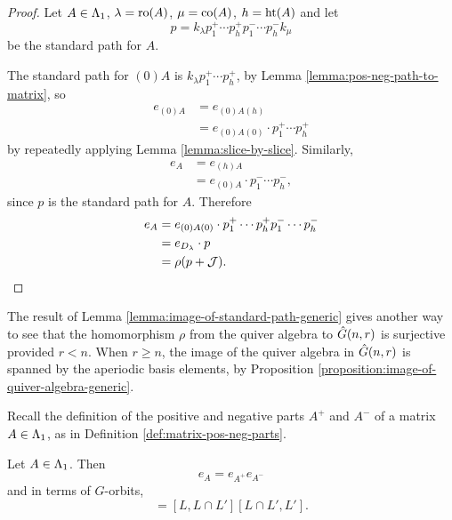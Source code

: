 \documentclass[a4paper, 11pt, twoside]{report}
\begin{document}
\begin{proof}
Let $A\in\Lambda_1{}$, $\lambda=\operatorname{ro}(A)$, $\mu=\operatorname{co}(A)$, $h=\operatorname{ht}(A)$ and let
\begin{equation*}
p=k_\lambda p_1^+\cdots p_h^+ p_1^-\cdots p_h^- k_\mu
\end{equation*}
be the standard path for $A$.

The standard path for $(0)A$ is $k_\lambda p_1^+\cdots p_h^+$, by Lemma \ref{lemma:pos-neg-path-to-matrix}, so
\begin{align*}
e_{(0)A}
&= e_{(0)A(h)}\\
&= e_{(0)A(0)}\cdot p_1^+\cdots p_h^+
\end{align*}
by repeatedly applying Lemma \ref{lemma:slice-by-slice}. Similarly,
\begin{align*}
e_A
&= e_{(h)A}\\
&= e_{(0)A}\cdot p_1^-\cdots p_h^-,
\end{align*}
since $p$ is the standard path for $A$. Therefore
\begin{align*}
e_A
&= e_{(0)A(0)}\cdot p_1^+\cdots p_h^+ p_1^-\cdots p_h^-\\
&= e_{D_{\lambda}}\cdot p\\
&= \rho(p+\mathcal{J}).
\end{align*}
\end{proof}

\begin{remark}
The result of Lemma \ref{lemma:image-of-standard-path-generic} gives another way to see that the homomorphism $\rho$ from the quiver algebra to $\hat{G}(n,r)$ is surjective provided $r<n$. When $r\geq n$, the image of the quiver algebra in $\hat{G}(n,r)$ is spanned by the aperiodic basis elements, by Proposition \ref{proposition:image-of-quiver-algebra-generic}.
\end{remark}

Recall the definition of the positive and negative parts $A^+$ and $A^-$ of a matrix $A\in\Lambda_1{}$, as in Definition \ref{def:matrix-pos-neg-parts}.

\begin{lemma}
Let $A\in\Lambda_1{}$. Then
\begin{equation*}
e_A = e_{A^+}e_{A^-}
\end{equation*}
and in terms of $G$-orbits,
\begin{equation*}
[L,L']=[L,L\cap L'][L\cap L',L'].
\end{equation*}
\end{lemma}
\end{document}
